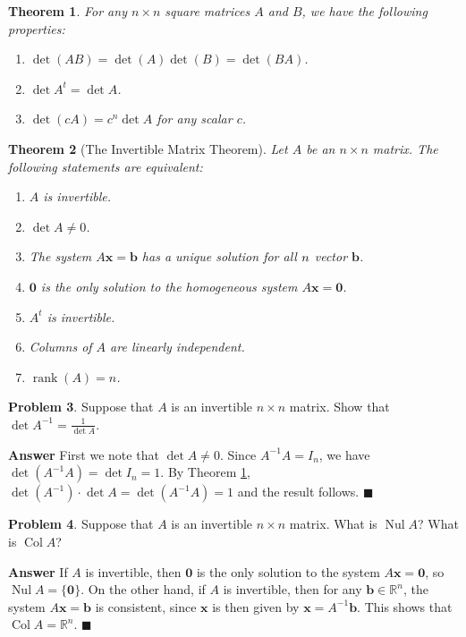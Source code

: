 \documentclass[12pt,letterpaper]{book}
\numberwithin{equation}{section}
\newtheorem{thm}{\textbf{Theorem}}[section]
\theoremstyle{definition}
\newtheorem{problem}[thm]{\textbf{Problem}}
\newenvironment{answer}{\noindent\textbf{Answer}}{\hfill$\blacksquare$\vspace{0.1in}}
\newcommand{\vx}{\bm{x}}
\newcommand{\vb}{\bm{b}}
\newcommand{\veczero}{\bm{0}}
\newcommand{\Nul}{\operatorname{Nul}}
\newcommand{\Coll}{\operatorname{Col}}
\newcommand{\rank}{\operatorname{rank}}
\begin{document}
\begin{thm}\label{det properties}
For any $n\times n$ square matrices $A$ and $B$, we have the following properties:
\begin{enumerate}
\item $\det(AB)=\det(A)\det(B)=\det(BA)$.
\item $\det A^t=\det A$.
\item $\det (cA)=c^n \det A$ for any scalar $c$.
\end{enumerate}
\end{thm}

\begin{thm}[The Invertible Matrix Theorem]
Let $A$ be an $n\times n$ matrix. The following statements are equivalent:
\begin{enumerate}
\item $A$ is invertible.
\item $\det A\neq 0$.
\item The system $A\vx=\vb$ has a unique solution for all $n\time 1$ vector $\vb$.
\item $\veczero$ is the only solution to the homogeneous system $A\vx=\veczero$.
\item $A^t$ is invertible.
\item Columns of $A$ are linearly independent.
\item $\rank (A)=n$.
\end{enumerate}
\end{thm}

\begin{problem}
Suppose that $A$ is an invertible $n\times n$ matrix. Show that $\displaystyle{\det A^{-1}=\frac{1}{\det A}}$.
\end{problem}

\begin{answer}
First we note that $\det A\neq 0$. Since $A^{-1}A=I_n$, we have $\det(A^{-1}A)=\det I_n=1$. By Theorem \ref{det properties}, $\det (A^{-1})\cdot \det A=\det(A^{-1}A)=1$ and the result follows.
\end{answer}

\begin{problem} Suppose that $A$ is an invertible $n\times n$ matrix. What is $\Nul A$? What is $\Coll A$?
\end{problem}

\begin{answer}
If $A$ is invertible, then $\veczero$ is the only solution to the system $A\vx=\veczero$, so $\Nul A=\{\veczero\}$. On the other hand, if $A$ is invertible, then for any $\vb \in \mathbb{R}^n$, the system $A\vx=\vb$ is consistent, since $\vx$ is then given by $\vx=A^{-1}\vb$. This shows that $\Coll A=\mathbb{R}^n$.
\end{answer}
\end{document}
